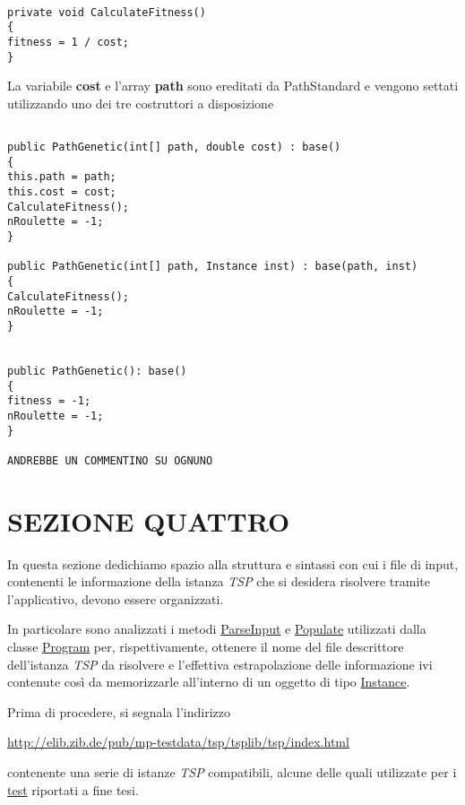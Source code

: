 \documentclass[11pt]{article}
\begin{document}
\begin{lstlisting}

private void CalculateFitness()
{
fitness = 1 / cost;
}

\end{lstlisting}

La variabile \textbf{cost} e l’array \textbf{path} sono ereditati da PathStandard e vengono settati utilizzando uno dei tre costruttori a disposizione

\begin{lstlisting}

public PathGenetic(int[] path, double cost) : base()
{
this.path = path;
this.cost = cost;
CalculateFitness();
nRoulette = -1;
}

public PathGenetic(int[] path, Instance inst) : base(path, inst)
{
CalculateFitness();
nRoulette = -1;
}


public PathGenetic(): base()
{
fitness = -1;
nRoulette = -1;
}

ANDREBBE UN COMMENTINO SU OGNUNO

\end{lstlisting}

\newpage

\section*{SEZIONE QUATTRO}
\label{sec:SezioneQuattroS}

In questa sezione dedichiamo spazio alla struttura e sintassi con cui i file di input, contenenti le informazione della istanza \textit{TSP} che si desidera risolvere tramite l'applicativo, devono essere organizzati.

In particolare sono analizzati i metodi \hyperref[sec:LetturaInputS]{ParseInput} e \hyperref[sec:MetodoPopulateS]{Populate} utilizzati dalla classe \hyperref[sec:ClasseProgramS]{Program} per, rispettivamente, ottenere il nome del file descrittore dell'istanza \textit{TSP} da risolvere e l'effettiva estrapolazione delle informazione ivi contenute così da memorizzarle all'interno di un oggetto di tipo \hyperref[sec:ClasseInstanceS]{Instance}.

Prima di procedere, si segnala l'indirizzo

\begin{center}
    \href{http://elib.zib.de/pub/mp-testdata/tsp/tsplib/tsp/index.html}{http://elib.zib.de/pub/mp-testdata/tsp/tsplib/tsp/index.html}
\end{center}

contenente una serie di istanze \textit{TSP} compatibili, alcune delle quali utilizzate per i \hyperref[sec:TestRisultatiS]{test} riportati a fine tesi.
\end{document}
